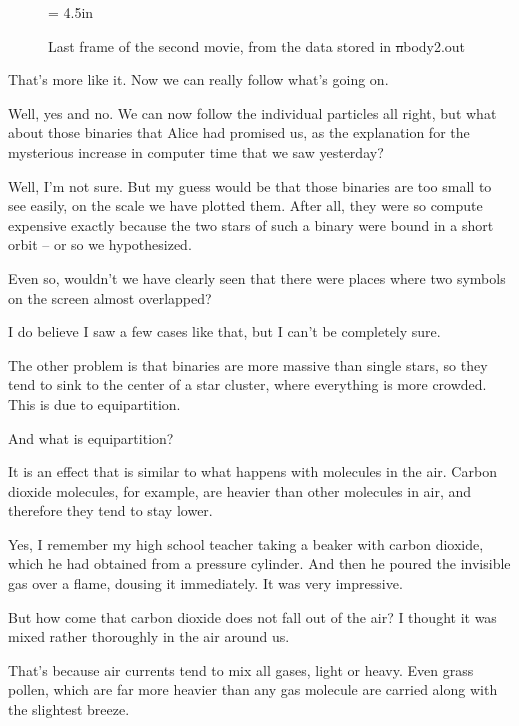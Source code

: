 \begin{figure}[htb]
\begin{center}
\epsfxsize = 4.5in
\caption[last frame of movie \#2]
{Last frame of the second movie, from the data stored in {\st nbody2.out}}
\label{fig:movie2}
\end{center}
\end{figure}

\abc

\bob
That's more like it.  Now we can really follow what's going on.

\carol
Well, yes and no.  We can now follow the individual particles all right,
but what about those binaries that Alice had promised us, as the
explanation for the mysterious increase in computer time that we saw
yesterday?

\alice
Well, I'm not sure.  But my guess would be that those binaries are too
small to see easily, on the scale we have plotted them.  After all,
they were so compute expensive exactly because the two stars of such a
binary were bound in a short orbit -- or so we hypothesized.

\bob
Even so, wouldn't we have clearly seen that there were places where
two symbols on the screen almost overlapped?

\carol
I do believe I saw a few cases like that, but I can't be completely
sure.

\alice
The other problem is that binaries are more massive than single stars,
so they tend to sink to the center of a star cluster, where everything
is more crowded.  This is due to equipartition.

\bob
And what is equipartition?

\alice
It is an effect that is similar to what happens with molecules in the air.
Carbon dioxide molecules, for example, are heavier than other
molecules in air, and therefore they tend to stay lower.

\carol
Yes, I remember my high school teacher taking a beaker with carbon dioxide,
which he had obtained from a pressure cylinder.  And then he poured
the invisible gas over a flame, dousing it immediately.  It was very
impressive.

\bob
But how come that carbon dioxide does not fall out of the air?  I
thought it was mixed rather thoroughly in the air around us.

\alice
That's because air currents tend to mix all gases, light or heavy.
Even grass pollen, which are far more heavier than any gas molecule
are carried along with the slightest breeze.

